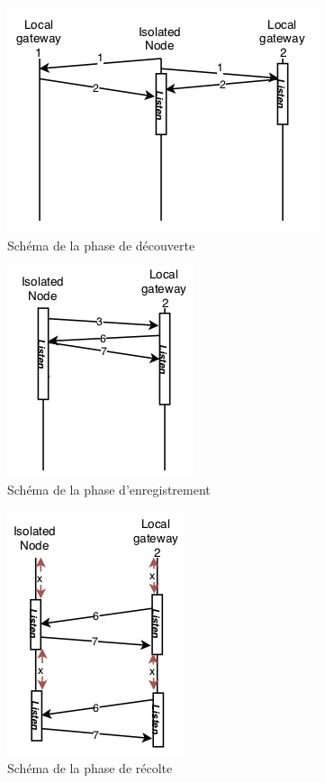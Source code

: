 \documentclass[a4paper, 11pt]{article}
\begin{document}
\begin{figure}[!ht]    \centering
   \includegraphics[scale=1]{discover.png} 
   \caption{Schéma de la phase de découverte}
   \label{Schéma de la phase de découverte}
\end{figure}

\begin{figure}[!ht]    \centering
   \includegraphics[scale=1]{register.png} 
   \caption{Schéma de la phase d'enregistrement}
   \label{Schéma de la phase d'enregistrement}
\end{figure}


\begin{figure}[!ht]    \centering
   \includegraphics[scale=1]{harvest.png} 
   \caption{Schéma de la phase de récolte}
   \label{Schéma de la phase de récolte}
\end{figure}
\end{document}
